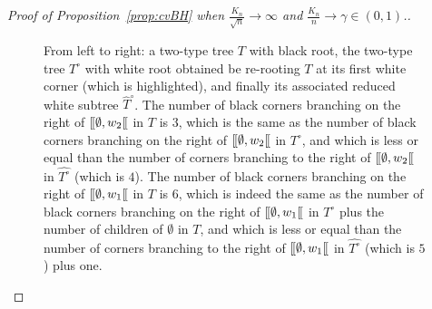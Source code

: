 \documentclass[AHL,XML,longabstracts,Unicode]{cedram}
\def\llbracket{[\hspace{-.10em} [ }
\begin{document}
\begin{proof}[Proof of  Proposition~\ref{prop:cvBH}  when $\tfrac{K_{n}}{\sqrt{n}} \rightarrow \infty$ and $ \tfrac{K_{n}}{n}  \rightarrow \gamma \in (0,1)$.]
\begin{figure}[t]
\begin{scriptsize}
\end{scriptsize}
\caption{From left to right: a two-type tree $T$ with black root, the two-type tree $T^{\circ}$ with white root obtained be re-rooting $T$ at its first white corner (which is highlighted), and finally its associated reduced white subtree $\hat{T}^{\circ}$. The  number of black corners branching on the right of $\llbracket \emptyset, w_{2} \llbracket$ in $T$ is $3$, which is   the same as the number of black corners branching on the right of $\llbracket \emptyset, w_{2} \llbracket$ in $T^{\circ}$, and which is less or equal than the number of corners branching to the right of $\llbracket \emptyset, w_{2} \llbracket$ in $\hat{T^{\circ}}$ (which is $4$).  The  number of black corners branching on the right of $\llbracket \emptyset, w_{1} \llbracket$ in $T$ is $6$, which is indeed  the same as the number of black corners branching on the right of $\llbracket \emptyset, w_{1} \llbracket$ in $T^{\circ}$ plus the number of children of $\emptyset$ in $T$, and which is less or equal than the number of corners branching to the right of $\llbracket \emptyset, w_{1} \llbracket$ in $\hat{T^{\circ}}$ (which is $5$) plus one.
}
\label{fig:whiteblack}
\end{figure}



\end{proof}
\end{document}
